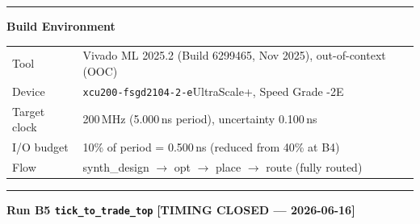 \documentclass[10pt,a4paper]{article}
\newcommand{\sectionrule}{\vspace{2pt}\textcolor{rulegray}{\rule{\linewidth}{0.8pt}}\vspace{2pt}}
\begin{document}
\sectionrule

{\large\bfseries\color{hdrblue} Build Environment}

\vspace{4pt}
\begin{center}
\renewcommand{\arraystretch}{1.2}
\begin{tabular}{@{}l l@{}}
\toprule
\rowcolor{tablegray}
Tool         & Vivado ML 2025.2 (Build 6299465, Nov 2025), out-of-context (OOC) \\
Device       & \texttt{xcu200-fsgd2104-2-e}\quad UltraScale+, Speed Grade -2E \\
\rowcolor{tablegray}
Target clock & 200\,MHz (5.000\,ns period), uncertainty 0.100\,ns \\
I/O budget   & 10\% of period = 0.500\,ns (reduced from 40\% at B4) \\
\rowcolor{tablegray}
Flow         & synth\_design $\to$ opt $\to$ place $\to$ route (fully routed) \\
\bottomrule
\end{tabular}
\end{center}

\sectionrule

{\large\bfseries\color{hdrblue} Run B5 \textendash{} \texttt{tick\_to\_trade\_top}\quad}%
{\large\color{okgreen}\textbf{[TIMING CLOSED — 2026-06-16]}}

\vspace{4pt}
\end{document}
